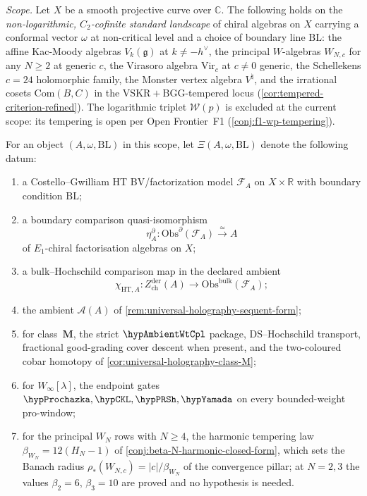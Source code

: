 \begin{theorem}
\emph{Scope.} Let $X$ be a smooth projective curve over
$\mathbb{C}$. The following holds on the \emph{non-logarithmic,
$C_{2}$-cofinite standard landscape} of chiral algebras on $X$
carrying a conformal vector $\omega$ at non-critical level and a
choice of boundary line $\mathrm{BL}$: the affine Kac-Moody algebras
$V_{k}(\mathfrak{g})$ at $k \neq -h^{\vee}$, the principal $W$-algebras
$W_{N,c}$ for any $N \ge 2$ at generic $c$, the Virasoro algebra
$\mathrm{Vir}_{c}$ at $c \neq 0$ generic, the Schellekens $c = 24$
holomorphic family, the Monster vertex algebra $V^{\natural}$, and
the irrational cosets $\mathrm{Com}(B,C)$ in the
$\mathrm{VSKR} + \mathrm{BGG}$-tempered locus
(\cref{cor:tempered-criterion-refined}). The logarithmic triplet
$\mathcal{W}(p)$ is excluded at the current scope: its tempering is
open per Open Frontier~F1 (\cref{conj:f1-wp-tempering}).

	For an object \((A,\omega,\mathrm{BL})\) in this scope, let
	\(\Xi(A,\omega,\mathrm{BL})\) denote the following datum:
	\begin{enumerate}[label=\textup{(\alph*)}]
	\item a Costello--Gwilliam HT BV/factorization model
	 \(\mathcal F_A\) on \(X\times\mathbb R\) with boundary condition
	 \(\mathrm{BL}\);
	\item a boundary comparison quasi-isomorphism
	 \[
	 \eta^\partial_A\colon
	 \mathrm{Obs}^{\partial}(\mathcal F_A)\xrightarrow{\simeq} A
	 \]
	 of \(E_1\)-chiral factorisation algebras on \(X\);
	\item a bulk--Hochschild comparison map in the declared ambient
	 \[
	 \chi_{\mathrm{HT},A}\colon
	 Z^{\mathrm{der}}_{\mathrm{ch}}(A)\longrightarrow
	 \mathrm{Obs}^{\mathrm{bulk}}(\mathcal F_A);
	 \]
	\item the ambient \(\mathcal A(A)\) of
	 \cref{rem:universal-holography-sequent-form};
	\item for class~\(\mathbf M\), the strict
	 \(\hypAmbientWtCpl\) package, DS--Hochschild transport, fractional
	 good-grading cover descent when present, and the two-coloured cobar
	 homotopy of
	 \cref{cor:universal-holography-class-M};
	\item for \(W_\infty[\lambda]\), the endpoint gates
	 \(\hypProchazka,\hypCKL,\hypPRSh,\hypYamada\) on every
	 bounded-weight pro-window;
	\item for the principal $W_{N}$ rows with $N \ge 4$, the harmonic
	 tempering law $\beta_{W_{N}} = 12(H_{N}-1)$ of
	 \cref{conj:beta-N-harmonic-closed-form}, which sets the Banach
	 radius $\rho_{*}(W_{N,c}) = |c|/\beta_{W_{N}}$ of the convergence
	 pillar; at $N = 2, 3$ the values $\beta_{2} = 6$, $\beta_{3} = 10$
	 are proved and no hypothesis is needed.
	\end{enumerate}


\end{theorem}
